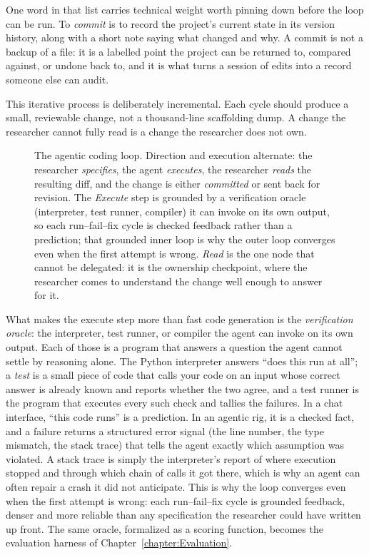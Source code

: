 One word in that list carries technical weight worth pinning down before the loop can be run.
To \emph{commit} is to record the project's current state in its version history, along with a short note saying what changed and why.
A commit is not a backup of a file: it is a labelled point the project can be returned to, compared against, or undone back to, and it is what turns a session of edits into a record someone else can audit.

This iterative process is deliberately incremental.
Each cycle should produce a small, reviewable change, not a thousand-line scaffolding dump.
A change the researcher cannot fully read is a change the researcher does not own.

\begin{figure}[htb!]
\begin{center}

\caption{The agentic coding loop.
Direction and execution alternate: the researcher \emph{specifies}, the agent \emph{executes}, the researcher \emph{reads} the resulting diff, and the change is either \emph{committed} or sent back for revision.
The \emph{Execute} step is grounded by a verification oracle (interpreter, test runner, compiler) it can invoke on its own output, so each run--fail--fix cycle is checked feedback rather than a prediction; that grounded inner loop is why the outer loop converges even when the first attempt is wrong.
\emph{Read} is the one node that cannot be delegated: it is the ownership checkpoint, where the researcher comes to understand the change well enough to answer for it.}
\label{figure:AgenticCodingLoop}
\end{center}
\end{figure}

What makes the execute step more than fast code generation is the \emph{verification oracle}: the interpreter, test runner, or compiler the agent can invoke on its own output.
Each of those is a program that answers a question the agent cannot settle by reasoning alone.
The Python interpreter answers ``does this run at all'';
a \emph{test} is a small piece of code that calls your code on an input whose correct answer is already known and reports whether the two agree,
and a test runner is the program that executes every such check and tallies the failures.
In a chat interface, ``this code runs'' is a prediction.
In an agentic rig, it is a checked fact, and a failure returns a structured error signal (the line number, the type mismatch, the stack trace) that tells the agent exactly which assumption was violated.
A stack trace is simply the interpreter's report of where execution stopped and through which chain of calls it got there, which is why an agent can often repair a crash it did not anticipate.
This is why the loop converges even when the first attempt is wrong: each run--fail--fix cycle is grounded feedback, denser and more reliable than any specification the researcher could have written up front.
The same oracle, formalized as a scoring function, becomes the evaluation harness of Chapter~\ref{chapter:Evaluation}.

